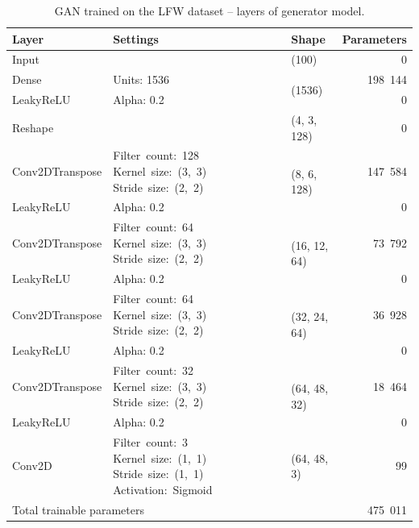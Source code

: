 \begin{table}
    \begin{center}
        \begin{tabular}{ |m{8em}|m{8.8em}|l|r| }
            \hline
                Layer & Settings & Shape & \multicolumn{1}{l|}{Parameters} \\
            \hline
            \hline
                Input & & (100) & 0 \\
            \hline
                Dense & Units: 1536 & \multirow{2}{6em}{(1536)} & 198~144 \\
            \cline{1-2} \cline{4-4}
                LeakyReLU & Alpha: 0.2 & & 0 \\
            \hline
                Reshape & & (4, 3, 128) & 0 \\
            \hline
                Conv2DTranspose & \mbox{Filter count: 128} \mbox{Kernel size: (3, 3)} \mbox{Stride size: (2, 2)} & \multirow{2}{6em}{(8, 6, 128)} & 147~584 \\
            \cline{1-2} \cline{4-4}
                LeakyReLU & Alpha: 0.2 & & 0 \\
            \hline
                Conv2DTranspose & \mbox{Filter count: 64} \mbox{Kernel size: (3, 3)} \mbox{Stride size: (2, 2)} & \multirow{2}{6em}{(16, 12, 64)} & 73~792 \\
            \cline{1-2} \cline{4-4}
                LeakyReLU & Alpha: 0.2 & & 0 \\
            \hline
                Conv2DTranspose & \mbox{Filter count: 64} \mbox{Kernel size: (3, 3)} \mbox{Stride size: (2, 2)} & \multirow{2}{6em}{(32, 24, 64)} & 36~928 \\
            \cline{1-2} \cline{4-4}
                LeakyReLU & Alpha: 0.2 & & 0 \\
            \hline
                Conv2DTranspose & \mbox{Filter count: 32} \mbox{Kernel size: (3, 3)} \mbox{Stride size: (2, 2)} & \multirow{2}{6em}{(64, 48, 32)} & 18~464 \\
            \cline{1-2} \cline{4-4}
                LeakyReLU & Alpha: 0.2 & & 0 \\
            \hline
                Conv2D & \mbox{Filter count: 3} \mbox{Kernel size: (1, 1)} \mbox{Stride size: (1, 1)} \mbox{Activation: Sigmoid} & (64, 48, 3) & 99 \\
            \hline
            \hline
                \multicolumn{3}{|l|}{Total trainable parameters} & 475~011 \\
            \hline
        \end{tabular}
    \end{center}
    \caption{\label{tab:gan-lfw-generator}GAN trained on the LFW dataset – layers of generator model.}
\end{table}

